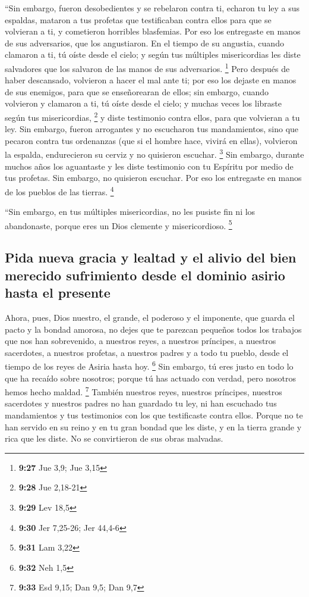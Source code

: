 \begin{paracol}{2}
 ``Sin embargo, fueron desobedientes y se rebelaron
contra ti, echaron tu ley a sus espaldas, mataron a tus profetas que
testificaban contra ellos para que se volvieran a ti, y cometieron
horribles blasfemias.  Por eso los entregaste en manos de
sus adversarios, que los angustiaron. En el tiempo de su angustia,
cuando clamaron a ti, tú oíste desde el cielo; y según tus múltiples
misericordias les diste salvadores que los salvaron de las manos de sus
adversarios. \footnote{\textbf{9:27} Jue 3,9; Jue 3,15} 
Pero después de haber descansado, volvieron a hacer el mal ante ti; por
eso los dejaste en manos de sus enemigos, para que se enseñorearan de
ellos; sin embargo, cuando volvieron y clamaron a ti, tú oíste desde el
cielo; y muchas veces los libraste según tus misericordias, \footnote{\textbf{9:28}
  Jue 2,18-21}  y diste testimonio contra ellos, para que
volvieran a tu ley. Sin embargo, fueron arrogantes y no escucharon tus
mandamientos, sino que pecaron contra tus ordenanzas (que si el hombre
hace, vivirá en ellas), volvieron la espalda, endurecieron su cerviz y
no quisieron escuchar. \footnote{\textbf{9:29} Lev 18,5} 
Sin embargo, durante muchos años los aguantaste y les diste testimonio
con tu Espíritu por medio de tus profetas. Sin embargo, no quisieron
escuchar. Por eso los entregaste en manos de los pueblos de las tierras.
\footnote{\textbf{9:30} Jer 7,25-26; Jer 44,4-6}

 ``Sin embargo, en tus múltiples misericordias, no les
pusiste fin ni los abandonaste, porque eres un Dios clemente y
misericordioso. \footnote{\textbf{9:31} Lam 3,22}

\hypertarget{pida-nueva-gracia-y-lealtad-y-el-alivio-del-bien-merecido-sufrimiento-desde-el-dominio-asirio-hasta-el-presente}{%
\subsection{Pida nueva gracia y lealtad y el alivio del bien merecido
sufrimiento desde el dominio asirio hasta el
presente}\label{pida-nueva-gracia-y-lealtad-y-el-alivio-del-bien-merecido-sufrimiento-desde-el-dominio-asirio-hasta-el-presente}}

 Ahora, pues, Dios nuestro, el grande, el poderoso y el
imponente, que guarda el pacto y la bondad amorosa, no dejes que te
parezcan pequeños todos los trabajos que nos han sobrevenido, a nuestros
reyes, a nuestros príncipes, a nuestros sacerdotes, a nuestros profetas,
a nuestros padres y a todo tu pueblo, desde el tiempo de los reyes de
Asiria hasta hoy. \footnote{\textbf{9:32} Neh 1,5}  Sin
embargo, tú eres justo en todo lo que ha recaído sobre nosotros; porque
tú has actuado con verdad, pero nosotros hemos hecho maldad. \footnote{\textbf{9:33}
  Esd 9,15; Dan 9,5; Dan 9,7}  También nuestros reyes,
nuestros príncipes, nuestros sacerdotes y nuestros padres no han
guardado tu ley, ni han escuchado tus mandamientos y tus testimonios con
los que testificaste contra ellos.  Porque no te han
servido en su reino y en tu gran bondad que les diste, y en la tierra
grande y rica que les diste. No se convirtieron de sus obras malvadas.


\end{paracol}

